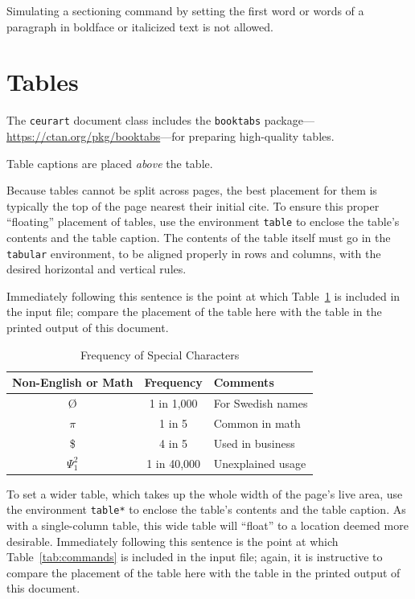 \documentclass[%
twocolumn
]{ceurart}
\begin{document}
Simulating a sectioning command by setting the first word or words of a paragraph in boldface or italicized text is not allowed.

\section{Tables}

The
\verb|ceurart|
document class includes the
\verb|booktabs|
package---\url{https://ctan.org/pkg/booktabs}---for preparing high-quality tables.

Table captions are placed \textit{above} the table.

Because tables cannot be split across pages, the best placement for them is typically the top of the page nearest their initial cite. To ensure this proper ``floating'' placement of tables, use the environment
\verb|table|
to enclose the table's contents and the table caption. The contents of the table itself must go in the
\verb|tabular|
environment, to be aligned properly in rows and columns, with the desired horizontal and vertical rules.

Immediately following this sentence is the point at which Table~\ref{tab:freq} is included in the input file; compare the placement of the table here with the table in the printed output of this document.

\begin{table}
  \caption{Frequency of Special Characters}
  \label{tab:freq}
  \begin{tabular}{ccl}
    \toprule
    Non-English or Math&Frequency&Comments\\
    \midrule
    \O & 1 in 1,000& For Swedish names\\
    $\pi$ & 1 in 5& Common in math\\
    \$ & 4 in 5 & Used in business\\
    $\Psi^2_1$ & 1 in 40,000& Unexplained usage\\
    \bottomrule
  \end{tabular}
\end{table}

To set a wider table, which takes up the whole width of the page's live area, use the environment
\verb|table*|
to enclose the table's contents and the table caption.  As with a single-column table, this wide table will
\enquote{float}
to a location deemed more desirable.
Immediately following this sentence is the point at which Table~\ref{tab:commands} is included in the input file; again, it is instructive to compare the placement of the table here with the table in the printed output of this document.
\end{document}
